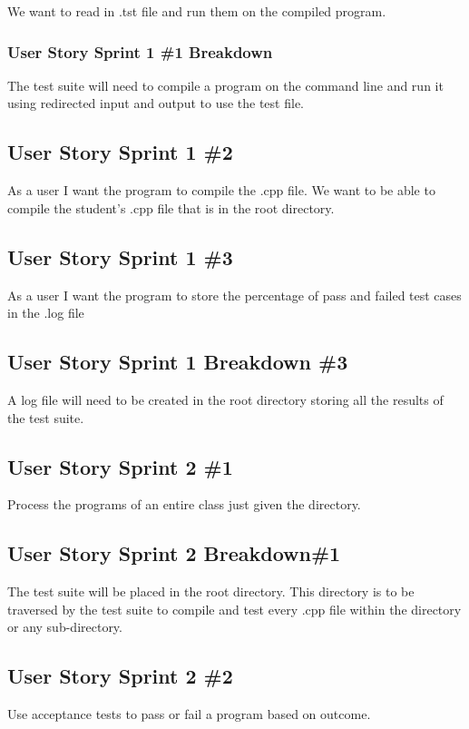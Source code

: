 We want to read in .tst file and run them on the compiled program.

\subsubsection{User Story Sprint 1 \#1 Breakdown}
The test suite will need to compile a program on the command line and run it using redirected input and output to use the test file.

\subsection{User Story Sprint 1 \#2} 
As a user I want the program to compile the .cpp file.
We want to be able to compile the student's .cpp file that is in the root directory.



\subsection{User Story Sprint 1 \#3} 
As a user I want the program to store the percentage of pass and failed test cases in the .log file

\subsection{User Story Sprint 1 Breakdown \#3}
A log file will need to be created in the root directory storing all the results of the test suite.

\subsection{User Story Sprint 2 \#1}
Process the programs of an entire class just given the directory.
 
\subsection{User Story Sprint 2 Breakdown\#1}
The test suite will be placed in the root directory. This directory is to be traversed by the test suite to compile and test every .cpp file within the directory or any sub-directory. 

\subsection{User Story Sprint 2 \#2}
Use acceptance tests to pass or fail a program based on outcome.

